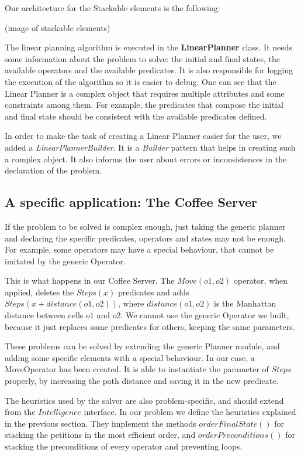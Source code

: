 \documentclass[12pt,a4paper,oneside]{article}
\numberwithin{equation}{section}
\numberwithin{equation}{section}
\theoremstyle{definition}
\begin{document}
Our architecture for the Stackable elements is the following:

(image of stackable elements)

The linear planning algorithm is executed in the \textbf{LinearPlanner} class. It needs some information about the problem to solve: the initial and final states, the available operators and the available predicates. It is also responsible for logging the execution of the algorithm so it is easier to debug. One can see that the Linear Planner is a complex object that requires multiple attributes and some constraints among them. For example, the predicates that compose the initial and final state should be consistent with the available predicates defined.

In order to make the task of creating a Linear Planner easier for the user, we added a \textit{LinearPlannerBuilder}. It is a \textit{Builder} pattern that helps in creating such a complex object. It also informs the user about errors or inconsistences in the declaration of the problem.


\subsection{A specific application: The Coffee Server}

If the problem to be solved is complex enough, just taking the generic planner and declaring the specific predicates, operators and states may not be enough. For example, some operators may have a special behaviour, that cannot be imitated by the generic Operator.

This is what happens in our Coffee Server. The $Move(o1,o2)$ operator, when applied, deletes the $Steps(x)$ predicates and adds $Steps(x + distance(o1,o2))$, where $distance(o1,o2)$ is the Manhattan distance between cells $o1$ and $o2$. We cannot use the generic Operator we built, because it just replaces some predicates for others, keeping the same parameters.

These problems can be solved by extending the generic Planner module, and adding some specific elements with a special behaviour. In our case, a MoveOperator has been created. It is able to instantiate the parameter of $Steps$ properly, by increasing the path distance and saving it in the new predicate.

The heuristics used by the solver are also problem-specific, and should extend from the $Intelligence$ interface. In our problem we define the heuristics explained in the previous section. They implement the methods $orderFinalState()$ for stacking the petitions in the most efficient order, and $orderPreconditions()$ for stacking the preconditions of every operator and preventing loops.
\end{document}
